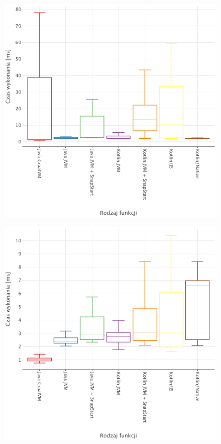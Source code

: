 \begin{figure}[h]
    \centering %
    \begin{minipage}[t]{0.48\textwidth} %
        \centering %
        \includegraphics[width=\linewidth]{charts/results/warm-start-boxplot-256.png}
        \label{fig:warm_start_256} %
    \end{minipage}%
    \hfill %
    \begin{minipage}[t]{0.48\textwidth}
        \centering
        \includegraphics[width=\linewidth]{charts/results/warm-start-boxplot-1024.png}

\end{minipage}
\end{figure}
